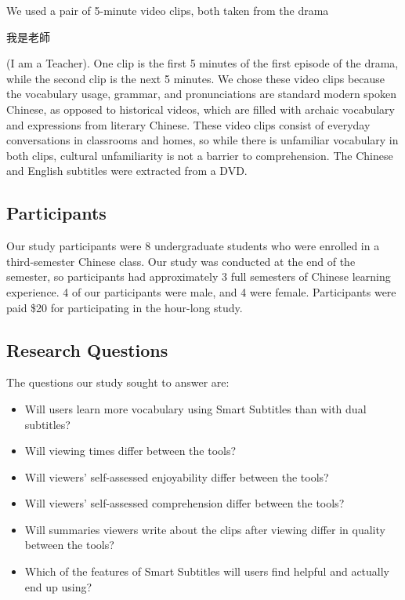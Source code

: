 \documentclass{sigchi}
\begin{document}
We used a pair of 5-minute video clips, both taken from the drama \begin{CJK}{UTF8}{min}我是老師\end{CJK} (I am a Teacher). One clip is the first 5 minutes of the first episode of the drama, while the second clip is the next 5 minutes. We chose these video clips because the vocabulary usage, grammar, and pronunciations are standard modern spoken Chinese, as opposed to historical videos, which are filled with archaic vocabulary and expressions from literary Chinese. These video clips
consist of everyday conversations in classrooms and homes,
so while there is unfamiliar vocabulary in both clips, cultural unfamiliarity is not a barrier to comprehension.
The Chinese and English subtitles were extracted from a DVD. %

\subsection{Participants}

Our study participants were 8 undergraduate students who were enrolled in a third-semester Chinese class. Our study was conducted at the end of the semester, so participants had approximately 3 full semesters of Chinese learning experience. 4 of our participants were male, and 4 were female.
Participants were paid \$20 for participating in the hour-long study.

\subsection{Research Questions}

The questions our study sought to answer are:

\begin{itemize}[noitemsep]
\item Will users learn more vocabulary using Smart Subtitles than with dual subtitles?
\item Will viewing times differ between the tools?
\item Will viewers' self-assessed enjoyability differ between the tools?
\item Will viewers' self-assessed comprehension differ between the tools?
\item Will summaries viewers write about the clips after viewing differ in quality between the tools?
\item Which of the features of Smart Subtitles will users find helpful and actually end up using?
\end{itemize}
\end{document}
